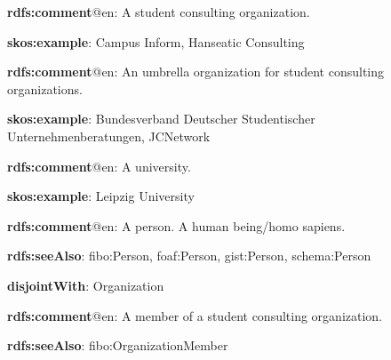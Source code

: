 \documentclass[a4paper, DIV=13, BCOR=0cm]{scrbook}
\begin{document}
\begin{mdframed}[style=onto-2, frametitle={Student Consulting Organization}]
	{%
		\begin{compactitem}
			\item \textbf{rdfs:comment}@en: A student consulting organization.
			\item \textbf{skos:example}: Campus Inform, Hanseatic Consulting
		\end{compactitem}
	} %
\end{mdframed}

\begin{mdframed}[style=onto-2, frametitle={Umbrella Organization}]
	{%
		\begin{compactitem}
			\item \textbf{rdfs:comment}@en: An umbrella organization for student consulting organizations.
			\item \textbf{skos:example}: Bundesverband Deutscher Studentischer Unternehmenberatungen, JCNetwork
		\end{compactitem}
	} %
\end{mdframed}

\begin{mdframed}[style=onto-2, frametitle={University}]
	{%
		\begin{compactitem}
			\item \textbf{rdfs:comment}@en: A university.
			\item \textbf{skos:example}: Leipzig University
		\end{compactitem}
	} %
\end{mdframed}

\begin{mdframed}[style=onto-1, frametitle={Person}]
	{%
		\begin{compactitem}
			\item \textbf{rdfs:comment}@en: A person. A human being/homo sapiens.
			\item \textbf{rdfs:seeAlso}: fibo:Person, foaf:Person, gist:Person, 
			schema:Person
			\item \textbf{disjointWith}: Organization
		\end{compactitem}
	} %
\end{mdframed}

\begin{mdframed}[style=onto-2, frametitle={Member}]
	{%
		\begin{compactitem}
			\item \textbf{rdfs:comment}@en: A member of a student consulting organization.
			\item \textbf{rdfs:seeAlso}: fibo:OrganizationMember
		\end{compactitem}
	} %
\end{mdframed}
\end{document}
